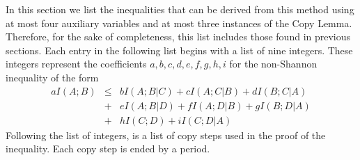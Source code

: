 \documentclass[10pt,journal]{IEEEtran}
\begin{document}
In this section we list the inequalities that can be derived from this method using
at most four auxiliary variables and at most three instances of the Copy Lemma.
Therefore, for the sake of completeness, this list includes those found in previous sections.
Each entry in the following list begins with a list of nine integers.  These integers represent the
coefficients $a,b,c,d,e,f,g,h,i$ for the non-Shannon inequality of the form
\begin{eqnarray*}
aI(A;B) &\leq& bI(A;B|C) + cI(A;C|B) + dI(B;C|A) \\
      &+&  eI(A;B|D) + fI(A;D|B)+ gI(B;D|A)\\
      &+& hI(C;D) + iI(C;D|A)
\end{eqnarray*}
Following the list of integers, is a list of copy steps used in the proof of the inequality.
Each copy step is ended by a period.
\end{document}
